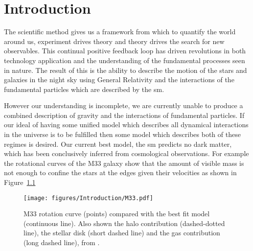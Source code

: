 \chapter{Introduction} %
\label{cha:introduction}


The scientific method gives us a framework from which to quantify the world 
around us, experiment drives theory and theory drives the search for new 
observables. This continual positive feedback loop has driven revolutions in 
both technology application and the understanding of the fundamental processes 
seen in nature. The result of this is the ability to describe the motion of the 
stars and galaxies in the night sky using General Relativity and the 
interactions of the fundamental particles which are described by the \ac{sm}.


However our understanding is incomplete, we are currently unable to produce a 
combined description of gravity and the interactions of fundamental particles. 
If our ideal of having some unified model which describes all dynamical 
interactions in the universe is to be fulfilled then some model which describes 
both of these regimes is desired.
Our current best model, the \ac{sm} predicts no dark matter, which has been 
conclusively inferred from cosmological observations. For example the 
rotational curves of the M33 galaxy\cite{Corbelli1999af} show that the amount 
of visible mass is not enough to confine the stars at the edges given their 
velocities as shown in Figure~\ref{fig:M33RotationalCurve}
\begin{figure}
 \texttt{[image: figures/Introduction/M33.pdf]}
\caption{ M33 rotation curve (points) compared with the best fit model
          (continuous line). Also shown  the halo contribution (dashed-dotted 
          line), the stellar disk (short dashed line) and  the gas contribution 
          (long dashed line), from \cite{Corbelli1999af}.
          }
\label{fig:M33RotationalCurve}
\end{figure}

